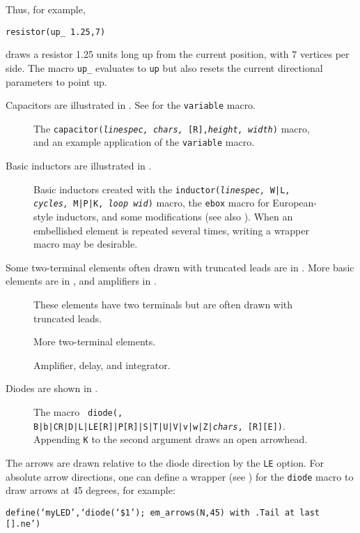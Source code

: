 Thus, for example,
\par
{\tt resistor(up\_ 1.25,7)}
\par
\noindent%
draws a resistor 1.25 units long up from the current position, with $7$
vertices per side.
The macro {\tt up\_} evaluates to {\tt up} but also resets the current
directional parameters to point up.

Capacitors are illustrated in .
See  for the {\tt variable} macro.
\begin{figure}[H]
   
   \caption{The {\tt capacitor({\sl linespec, chars,} [R],{\sl height, width})}
      macro, and an example application of the {\tt variable} macro.}
   \label{Capacitors}
    \end{figure}

Basic inductors are illustrated in .
\begin{figure}[H]
   
   \caption{Basic inductors created with the
    {\tt inductor({\sl linespec,} W|L, {\sl cycles,} M|P|K, {\sl loop wid})}
    macro, the {\tt ebox} macro for European-style inductors, and some
    modifications (see also ).
    When an embellished element is repeated several times,
    writing a wrapper macro may be desirable.}
   \label{Inductors}
    \end{figure}

Some two-terminal elements often drawn with truncated leads are in
.
More basic elements are in , and amplifiers in .
\begin{figure}[H]
   
   \caption{These elements have two terminals but are often drawn
     with truncated leads.}
   \label{heaterMan}
    \end{figure}
\begin{figure}[H]
   
   \caption{More two-terminal elements.}
   \label{MoreTable}
    \end{figure}
\begin{figure}[H]
\vspace*{-\baselineskip}
   
   \caption{Amplifier, delay, and integrator.}
   \label{AmpTable}
   \end{figure}

Diodes are shown in .
\begin{figure}[H]
   
   \caption{The macro {\tt
     diode(\linespec, B|b|CR|D|L|LE[R]|P[R]|S|T|U|V|v|w|Z|{\sl chars}, [R][E])}.
      Appending {\tt K} to the second argument draws an open arrowhead.}
   \label{Diodes}
   \end{figure}
The arrows are drawn relative to the diode direction by the {\tt LE}
option. For absolute arrow directions, one can
define a wrapper (see ) for the {\tt diode} macro to draw arrows
at 45 degrees, for example:
\par
{\tt define(`myLED',`diode(`\$1'); em\_arrows(N,45)
 with .Tail at last [].ne')}

